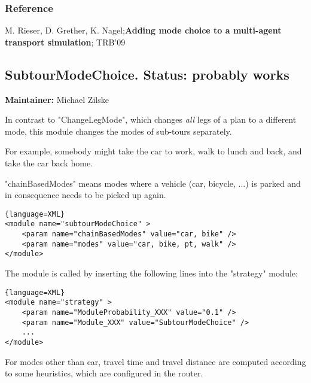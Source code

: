 \subsubsection{Reference}

M. Rieser, D. Grether, K. Nagel;\textbf{Adding mode choice to a multi-agent transport simulation}; TRB'09

\subsection{SubtourModeChoice. Status: probably works}

\textbf{Maintainer:} Michael Zilske

In contrast to "ChangeLegMode", which changes \emph{all} legs of a plan to a different mode, this module changes the modes of sub-tours separately.

For example, somebody might take the car to work, walk to lunch and back, and take the car back home.

"chainBasedModes" means modes where a vehicle (car, bicycle,  ...) is parked and in consequence needs to be picked up again.
\begin{lstlisting}{language=XML}
<module name="subtourModeChoice" >
    <param name="chainBasedModes" value="car, bike" />
    <param name="modes" value="car, bike, pt, walk" />
</module>
\end{lstlisting}


The module is called by inserting the following lines into the "strategy" module:
\begin{lstlisting}{language=XML}
<module name="strategy" >
    <param name="ModuleProbability_XXX" value="0.1" />
    <param name="Module_XXX" value="SubtourModeChoice" />
    ...
</module>
\end{lstlisting}


For modes other than car, travel time and travel distance are  computed according to some heuristics, which are configured in the  router.

\umbruch


